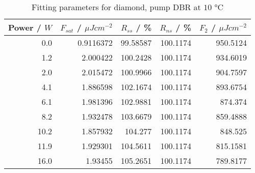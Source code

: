 \begin{table}[H]
\caption{Fitting parameters for diamond, pump DBR at $10$ °C}
\begin{tabular}{rrrrr}
\toprule
Power / $W$ & $F_{sat}$ / $\mu Jcm^{-2}$ & $R_{ss}$ / \% & $R_{ns}$ / \% & $F_2$ / $\mu Jcm^{-2}$ \\
\midrule
0.0 & 0.9116372 & 99.58587 & 100.1174 & 950.5124 \\
1.2 & 2.000422 & 100.2428 & 100.1174 & 934.6019 \\
2.0 & 2.015472 & 100.9966 & 100.1174 & 904.7597 \\
4.1 & 1.886598 & 102.1674 & 100.1174 & 893.6754 \\
6.1 & 1.981396 & 102.9881 & 100.1174 & 874.374 \\
8.2 & 1.932478 & 103.6679 & 100.1174 & 859.4888 \\
10.2 & 1.857932 & 104.277 & 100.1174 & 848.525 \\
11.9 & 1.929301 & 104.5611 & 100.1174 & 815.1581 \\
16.0 & 1.93455 & 105.2651 & 100.1174 & 789.8177 \\
\bottomrule
\end{tabular}
\end{table}
